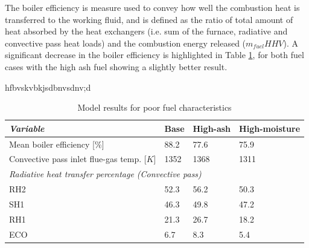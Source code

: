 \documentclass[a4paper,fleqn]{cas-dc}
\begin{document}
The boiler efficiency is measure used to convey how well the combustion heat is transferred to the working fluid, and is defined as the ratio of total amount of heat absorbed by the heat exchangers (i.e. sum of the furnace, radiative and convective pass heat loads) and the combustion energy released ($m_{fuel}HHV$). A significant decrease in the boiler efficiency is highlighted in Table \ref{tbl_fuel_results}, for both fuel cases with the high ash fuel showing a slightly better result. 

hfbvskvbkjsdbnvsdnv;d
\begin{table}[h!]
\caption{Model results for poor fuel characteristics}\label{tbl_fuel_results}
\begin{tabular*}{\tblwidth}{p{}p{}p{}p{}}
\toprule
\textit{Variable}& Base & High-ash & High-moisture \\ %
\midrule
Mean boiler efficiency [\%]& 88.2 & 77.6 & 75.9\\
Convective pass inlet flue-gas temp. [$K$]& 1352 & 1368 & 1311\\
\midrule
\multicolumn{4}{l}{\textit{Radiative heat transfer percentage (Convective pass)} }\\
\midrule
RH2 & 52.3& 56.2 & 50.3\\
SH1 & 46.3& 49.8& 47.2\\
RH1 & 21.3& 26.7& 18.2\\
ECO & 6.7& 8.3& 5.4\\
\bottomrule
\end{tabular*}
\end{table}  
\end{document}

